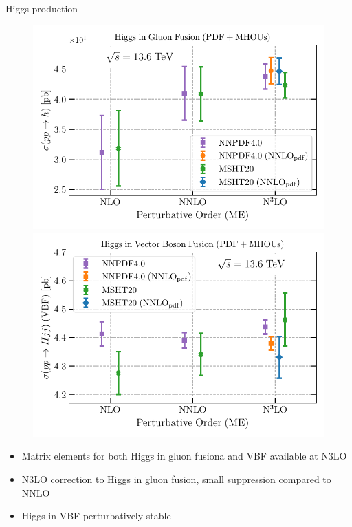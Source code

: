 \documentclass[aspectratio=169, 9pt,t]{beamer}
\begin{document}
\begin{frame}{Higgs production}
  \begin{figure}[!t]
    \centering
    \includegraphics[width=0.49\linewidth]{figures/higgs-ggF-n3lo.pdf}
    \includegraphics[width=0.49\linewidth]{figures/H_VBF-n3lo.pdf}
  \end{figure}
  \begin{itemize}
    \item Matrix elements for both Higgs in gluon fusiona and VBF available at N3LO
    \item N3LO correction to Higgs in gluon fusion, small suppression compared to NNLO
    \item Higgs in VBF perturbatively stable
  \end{itemize}
\end{frame}
\end{document}

